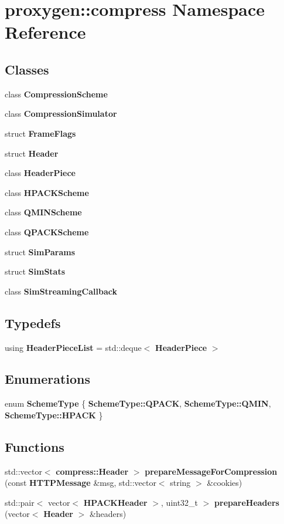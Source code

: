 \section{proxygen\+:\+:compress Namespace Reference}
\label{namespaceproxygen_1_1compress}
\subsection*{Classes}
\begin{DoxyCompactItemize}
\item 
class {\bf Compression\+Scheme}
\item 
class {\bf Compression\+Simulator}
\item 
struct {\bf Frame\+Flags}
\item 
struct {\bf Header}
\item 
class {\bf Header\+Piece}
\item 
class {\bf H\+P\+A\+C\+K\+Scheme}
\item 
class {\bf Q\+M\+I\+N\+Scheme}
\item 
class {\bf Q\+P\+A\+C\+K\+Scheme}
\item 
struct {\bf Sim\+Params}
\item 
struct {\bf Sim\+Stats}
\item 
class {\bf Sim\+Streaming\+Callback}
\end{DoxyCompactItemize}
\subsection*{Typedefs}
\begin{DoxyCompactItemize}
\item 
using {\bf Header\+Piece\+List} = std\+::deque$<$ {\bf Header\+Piece} $>$
\end{DoxyCompactItemize}
\subsection*{Enumerations}
\begin{DoxyCompactItemize}
\item 
enum {\bf Scheme\+Type} \{ {\bf Scheme\+Type\+::\+Q\+P\+A\+CK}, 
{\bf Scheme\+Type\+::\+Q\+M\+IN}, 
{\bf Scheme\+Type\+::\+H\+P\+A\+CK}
 \}
\end{DoxyCompactItemize}
\subsection*{Functions}
\begin{DoxyCompactItemize}
\item 
std\+::vector$<$ {\bf compress\+::\+Header} $>$ {\bf prepare\+Message\+For\+Compression} (const {\bf H\+T\+T\+P\+Message} \&msg, std\+::vector$<$ string $>$ \&cookies)
\item 
std\+::pair$<$ vector$<$ {\bf H\+P\+A\+C\+K\+Header} $>$, uint32\+\_\+t $>$ {\bf prepare\+Headers} (vector$<$ {\bf Header} $>$ \&headers)
\end{DoxyCompactItemize}


